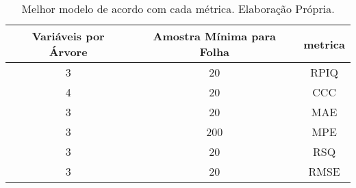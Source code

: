 \begin{table}

\caption{\label{tab:tabela_metricas}Melhor modelo de acordo com cada métrica. Elaboração Própria.}
\centering
\begin{tabular}[t]{c|c|c}
\hline
Variáveis por Árvore & Amostra Mínima para Folha & metrica\\
\hline
3 & 20 & RPIQ\\
\hline
4 & 20 & CCC\\
\hline
3 & 20 & MAE\\
\hline
3 & 200 & MPE\\
\hline
3 & 20 & RSQ\\
\hline
3 & 20 & RMSE\\
\hline
\end{tabular}
\end{table}

